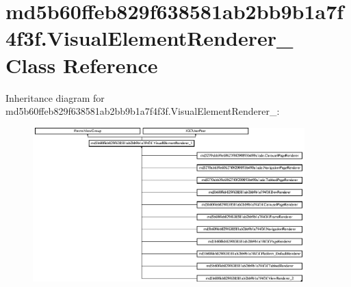 \hypertarget{classmd5b60ffeb829f638581ab2bb9b1a7f4f3f_1_1VisualElementRenderer__1}{}\section{md5b60ffeb829f638581ab2bb9b1a7f4f3f.\+Visual\+Element\+Renderer\+\_ Class Reference}
\label{classmd5b60ffeb829f638581ab2bb9b1a7f4f3f_1_1VisualElementRenderer__1}
Inheritance diagram for md5b60ffeb829f638581ab2bb9b1a7f4f3f.\+Visual\+Element\+Renderer\+\_\+:\begin{figure}[H]
\begin{center}
\leavevmode
\includegraphics[height=5.962326cm]{classmd5b60ffeb829f638581ab2bb9b1a7f4f3f_1_1VisualElementRenderer__1}
\end{center}
\end{figure}
